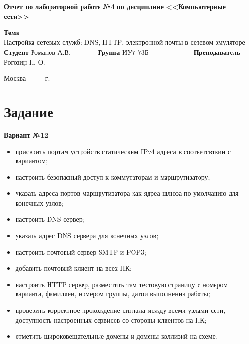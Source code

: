 \documentclass[12pt]{report}
\begin{document}
\begin{titlepage}
		\begin{center}
			\noindent\begin{minipage}{1.1\textwidth}\centering
				\Large\textbf{  Отчет по лабораторной работе №4}\newline
				\textbf{по дисциплине <<Компьютерные сети>>}\newline\newline\newline
			\end{minipage}
		\end{center}
		
		\noindent\textbf{Тема} $\underline{\text{Настройка сетевых служб: DNS, HTTP, электронной почты в сетевом эмуляторе}}$\newline\newline
		\noindent\textbf{Студент} $\underline{\text{Романов А.В.~~~~~~~~~~~}}$\newline\newline
		\noindent\textbf{Группа} $\underline{\text{ИУ7-73Б~~~~~~~~~~~~~~~~~~~}}$\newline\newline
		\noindent\textbf{Преподаватель} $\underline{\text{Рогозин Н. О.}}$\newline\newline\newline
		
		\begin{center}
			\vfill
			Москва~---~\the\year
			~г.
		\end{center}
	\end{titlepage}


\section*{Задание}

\textbf{Вариант №12}

\begin{itemize}
	\item присвоить портам устройств статическим IPv4 адреса в соответсвтвии с вариантом;
	\item настроить безопасный доступ к коммутаторам и маршрутизатору;
	\item указать адреса портов маршрутизатора как ядреа шлюза по умолчанию для конечных узлов;
	\item настроить DNS сервер;
	\item указать адрес DNS сервера для конечных узлов;
	\item настроить почтовый сервер SMTP и POP3;
	\item добавить почтовый клиент на всех ПК;
	\item настроить HTTP сервер, разместить там тестовую страницу с номером варианта, фамилией, номером группы, датой выполнения работы;
	\item проверить корректное прохождение сигнала между всеми узлами сети, доступность настроенных сервисов со стороны клиентов на ПК;
	\item отметить широковещательные домены и домены коллизий на схеме.
\end{itemize}
\end{document}
